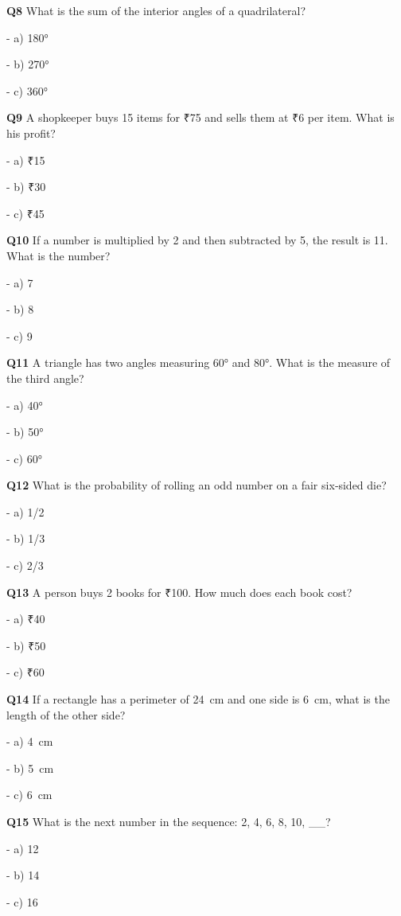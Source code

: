 \textbf{Q8} What is the sum of the interior angles of a quadrilateral?\par
\quad - a) 180°\par
\quad - b) 270°\par
\quad - c) 360°\par

\textbf{Q9} A shopkeeper buys 15 items for ₹75 and sells them at ₹6 per item. What is his profit?\par
\quad - a) ₹15\par
\quad - b) ₹30\par
\quad - c) ₹45\par

\textbf{Q10} If a number is multiplied by 2 and then subtracted by 5, the result is 11. What is the number?\par
\quad - a) 7\par
\quad - b) 8\par
\quad - c) 9\par

\textbf{Q11} A triangle has two angles measuring 60° and 80°. What is the measure of the third angle?\par
\quad - a) 40°\par
\quad - b) 50°\par
\quad - c) 60°\par

\textbf{Q12} What is the probability of rolling an odd number on a fair six‑sided die?\par
\quad - a) 1/2\par
\quad - b) 1/3\par
\quad - c) 2/3\par

\textbf{Q13} A person buys 2 books for ₹100. How much does each book cost?\par
\quad - a) ₹40\par
\quad - b) ₹50\par
\quad - c) ₹60\par

\textbf{Q14} If a rectangle has a perimeter of 24 cm and one side is 6 cm, what is the length of the other side?\par
\quad - a) 4 cm\par
\quad - b) 5 cm\par
\quad - c) 6 cm\par

\textbf{Q15} What is the next number in the sequence: 2, 4, 6, 8, 10, __?\par
\quad - a) 12\par
\quad - b) 14\par
\quad - c) 16\par

